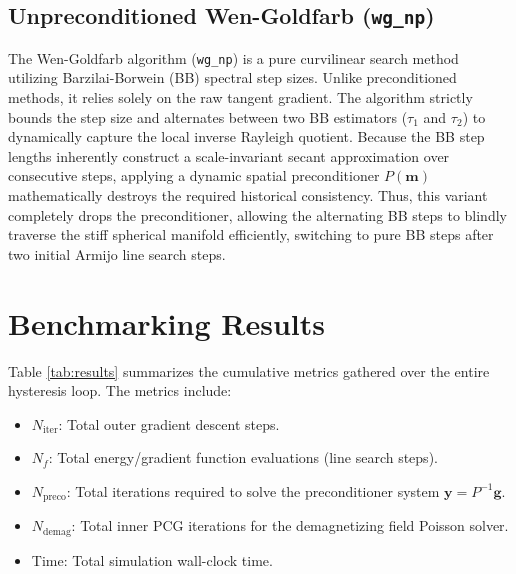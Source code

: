 \documentclass[11pt,a4paper]{article}
\begin{document}
\subsection{Unpreconditioned Wen-Goldfarb (\texttt{wg\_np})}
The Wen-Goldfarb algorithm (\texttt{wg\_np}) \cite{goldfarb2009curvilinear} is a pure curvilinear search method utilizing Barzilai-Borwein (BB) spectral step sizes. Unlike preconditioned methods, it relies solely on the raw tangent gradient. The algorithm strictly bounds the step size and alternates between two BB estimators ($\tau_1$ and $\tau_2$) to dynamically capture the local inverse Rayleigh quotient. Because the BB step lengths inherently construct a scale-invariant secant approximation over consecutive steps, applying a dynamic spatial preconditioner $P(\mathbf{m})$ mathematically destroys the required historical consistency. Thus, this variant completely drops the preconditioner, allowing the alternating BB steps to blindly traverse the stiff spherical manifold efficiently, switching to pure BB steps after two initial Armijo line search steps.

\section{Benchmarking Results}

Table \ref{tab:results} summarizes the cumulative metrics gathered over the entire hysteresis loop. The metrics include:
\begin{itemize}
    \item $N_{\text{iter}}$: Total outer gradient descent steps.
    \item $N_f$: Total energy/gradient function evaluations (line search steps).
    \item $N_{\text{preco}}$: Total iterations required to solve the preconditioner system $\mathbf{y} = P^{-1}\mathbf{g}$.
    \item $N_{\text{demag}}$: Total inner PCG iterations for the demagnetizing field Poisson solver.
    \item Time: Total simulation wall-clock time.
\end{itemize}
\end{document}

